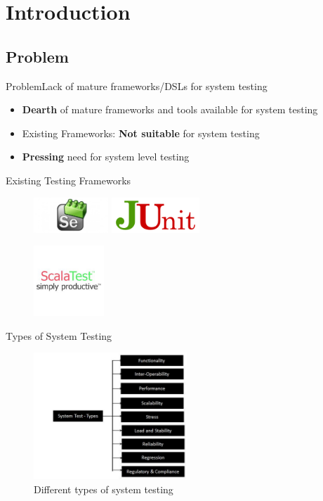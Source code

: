 \section{Introduction}

\subsection{Problem}
\begin{frame}{Problem}{Lack of mature frameworks/DSLs for system testing}
  \begin{itemize}
  \item \textbf{Dearth} of mature frameworks and tools available for system testing
  \item Existing Frameworks: \textbf{Not suitable} for system testing
  \item \textbf{Pressing} need for system level testing
  \end{itemize}
\end{frame}

\begin{frame}{Existing Testing Frameworks}
\begin{figure}[h!]
  \centering
    \includegraphics[height=50px]{figures/selenium.jpg}
    \includegraphics[height=50px]{figures/junit-logo.png}
\end{figure}
\begin{figure}[h!]
  \centering
    \includegraphics[height=100px]{figures/scalaTest.jpg}
\end{figure}
\end{frame}

\begin{frame}{Types of System Testing}
\begin{figure}[h!]
  \centering
    \includegraphics[height=180px]{figures/system_testing_types.png}
  \caption{Different types of system testing}
\end{figure}
\end{frame}

